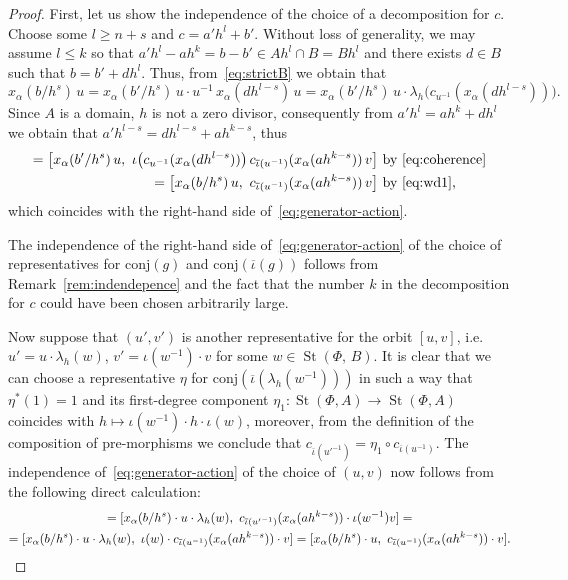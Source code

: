 \documentclass[oneside, 11pt]{amsart}
\numberwithin{equation}{section}
\newcommand{\St}{\mathop{\mathrm{St}}\nolimits}
\theoremstyle{definition}
\theoremstyle{definition}
\theoremstyle{remark}
\begin{document}
\begin{proof}
First, let us show the independence of the choice of a decomposition for $c$. 
Choose some $l \geq n + s$ and $c = a' h^{l} + b'$. Without loss of generality, we may assume $l \leq k$ so that $a' h^{l} - a h^k = b - b' \in Ah^{l} \cap B = Bh^{l}$ and there exists $d \in B$ such that $b = b' + dh^{l}$. Thus, from~\eqref{eq:strictB} we obtain that
\begin{equation} \label{eq:wd1} \textstyle x_\alpha(b/{h^s})\, u = x_\alpha({b'}/{h^s})\, u \cdot u^{-1}\, x_\alpha(dh^{l-s})\, u =  x_\alpha({b'}/{h^s})\, u \cdot \lambda_h \bigl(c_{u^{-1}}(x_\alpha(dh^{l-s}))\bigr). \end{equation}
Since $A$ is a domain, $h$ is not a zero divisor, consequently from $a'h^l = ah^k + dh^l$ we obtain that $a'h^{l-s} = dh^{l-s} + ah^{k-s}$, thus
\begin{align*}
[x_\alpha(b'/{h^s})\, u,\ c_{\overline{\iota}(u^{-1})}(x_\alpha(a'h^{l - s}))\, v\bigr] = \bigl[x_\alpha(b'/{h^s})\, u,\ \iota\bigl(c_{u^{-1}}(x_\alpha(dh^{l-s}))\bigr)\, c_{\overline{\iota}(u^{-1})}(x_\alpha(ah^{k - s}))\, v\bigr] & \text{ by~\eqref{eq:coherence}} \\ = \bigl[x_\alpha(b/{h^s})\, u,\ c_{\overline{\iota}(u^{-1})}(x_\alpha(ah^{k - s}))\, v\bigr] &\text{ by~\eqref{eq:wd1},}
\end{align*}
 which coincides with the right-hand side of~\eqref{eq:generator-action}.

The independence of the right-hand side of~\eqref{eq:generator-action} of the choice of representatives for $\mathrm{conj}(g)$ and $\mathrm{conj}(\overline{\iota}(g))$ follows from Remark~\ref{rem:indendepence} and the fact that the number $k$ in the decomposition for $c$ could have been chosen arbitrarily large.

Now suppose that $(u', v')$ is another representative for the orbit $[u, v]$, i.e. $u' = u \cdot \lambda_h(w)$, $v' = \iota(w^{-1})\cdot v$ for some $w \in \St(\Phi,\,B)$. It is clear that we can choose a representative $\eta$ for $\mathrm{conj}(\overline{\iota}(\lambda_h(w^{-1})))$ in such a way that $\eta^*(1)=1$ and its first-degree component $\eta_1 \colon \St(\Phi, A) \to \St(\Phi, A)$ coincides with $h \mapsto \iota(w^{-1}) \cdot h \cdot \iota(w)$, moreover, from the definition of the composition of pre-morphisms we conclude that $c_{\overline{\iota}({u'}^{-1})} =  \eta_1 \circ c_{\overline{\iota}(u^{-1})} $. The independence of~\eqref{eq:generator-action} of the choice of $(u, v)$ now follows from the following direct calculation:
\begin{multline*}
 [x_\alpha(b/h^s) \cdot u',\ c_{\overline{\iota}({u'}^{-1})}(x_\alpha(ah^{k-s}))\cdot v'] = [x_\alpha(b/h^s) \cdot u \cdot \lambda_h(w),\ c_{\overline{\iota}({u'}^{-1})}(x_\alpha(ah^{k-s}))\cdot \iota(w^{-1}) v] = \\
 = [x_\alpha(b/h^s) \cdot u \cdot \lambda_h(w),\ \iota(w) \cdot c_{\overline{\iota}(u^{-1})}(x_\alpha(ah^{k-s}))\cdot v] 
 = [x_\alpha(b/h^s) \cdot u,\ c_{\overline{\iota}(u^{-1})}(x_\alpha(ah^{k-s}))\cdot v]. \qedhere
\end{multline*}
\end{proof}
\end{document}
